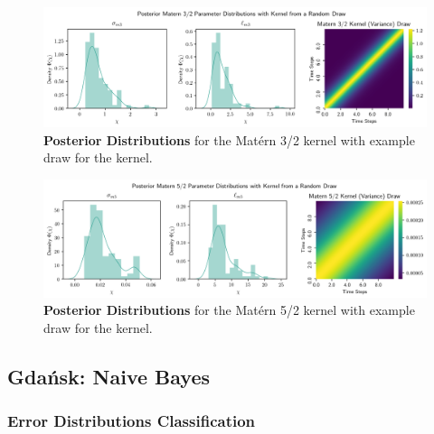 \documentclass[11pt]{scrartcl}
\begin{document}
\begin{figure}[!hbt]
	\center
	\includegraphics[width=1.2\textwidth,center]{img/gp/gp_kernel_posterior_matern3_zoomed.png}
	\caption{\textcolor{viridis5}{\textbf{Posterior Distributions}} for the Matérn 3/2 kernel with example draw for the kernel.}
	\label{fig:gp_kernel_posterior_matern3}
\end{figure}

\begin{figure}[!hbt]
	\center
	\includegraphics[width=1.2\textwidth,center]{img/gp/gp_kernel_posterior_matern5_zoomed.png}
	\caption{\textcolor{viridis5}{\textbf{Posterior Distributions}} for the Matérn 5/2 kernel with example draw for the kernel.}
	\label{fig:gp_kernel_posterior_matern5}
\end{figure}



\FloatBarrier
\subsection{Gdańsk: Naive Bayes}
\label{sec:original_gdansk_naive_bayes_classification}

\subsubsection{Error Distributions Classification}
\end{document}
